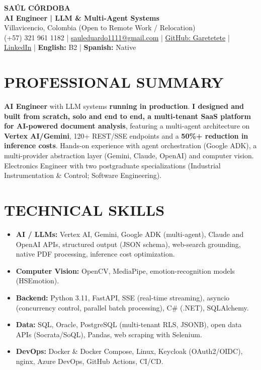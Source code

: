 \documentclass[letterpaper,10pt]{article}
\begin{document}
\begin{center}
    {\Huge \bfseries SAÚL CÓRDOBA} \\[3pt]
    {\Large \textbf{AI Engineer | LLM \& Multi-Agent Systems}} \\[2pt]
    Villavicencio, Colombia (Open to Remote Work / Relocation) \\
    (+57) 321 961 1182 | \href{mailto:sauleduardo1111@gmail.com}{sauleduardo1111@gmail.com} | \href{https://github.com/Garetetete}{GitHub: Garetetete} | \href{https://www.linkedin.com/in/saul-cordoba-a2997427b}{LinkedIn} | \textbf{English:} B2 | \textbf{Spanish:} Native
\end{center}

\section{PROFESSIONAL SUMMARY}
\textbf{AI Engineer} with LLM systems \textbf{running in production}. \textbf{I designed and built from scratch, solo and end to end, a multi-tenant SaaS platform for AI-powered document analysis}, featuring a multi-agent architecture on \textbf{Vertex AI/Gemini}, 120+ REST/SSE endpoints and a \textbf{50\%+ reduction in inference costs}. Hands-on experience with agent orchestration (Google ADK), a multi-provider abstraction layer (Gemini, Claude, OpenAI) and computer vision. Electronics Engineer with two postgraduate specializations (Industrial Instrumentation \& Control; Software Engineering).

\section{TECHNICAL SKILLS}
\begin{itemize}
    \item \textbf{AI / LLMs:} Vertex AI, Gemini, Google ADK (multi-agent), Claude and OpenAI APIs, structured output (JSON schema), web-search grounding, native PDF processing, inference cost optimization.
    \item \textbf{Computer Vision:} OpenCV, MediaPipe, emotion-recognition models (HSEmotion).
    \item \textbf{Backend:} Python 3.11, FastAPI, SSE (real-time streaming), asyncio (concurrency control, parallel batch processing), C\# (.NET), SQLAlchemy.
    \item \textbf{Data:} SQL, Oracle, PostgreSQL (multi-tenant RLS, JSONB), open data APIs (Socrata/SoQL), Pandas, web scraping with Selenium.
    \item \textbf{DevOps:} Docker \& Docker Compose, Linux, Keycloak (OAuth2/OIDC), nginx, Azure DevOps, GitHub Actions, CI/CD.
\end{itemize}
\end{document}
